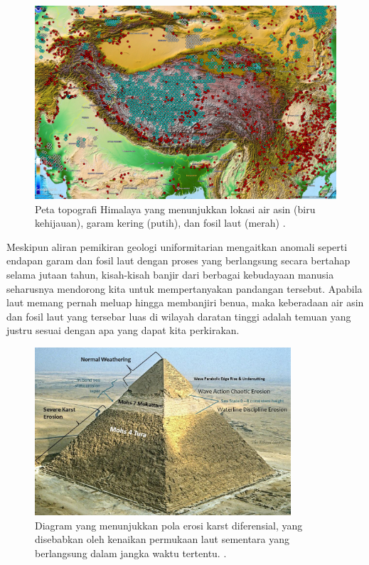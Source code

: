 \documentclass[10pt,twocolumn,letterpaper]{article}
\begin{document}
\begin{figure}[t]
\begin{center}
   \includegraphics[width=1\linewidth]{tibet.jpg}
\end{center}
   \caption{Peta topografi Himalaya yang menunjukkan lokasi air asin (biru kehijauan), garam kering (putih), dan fosil laut (merah) \cite{15,16,86,87}.}
\label{fig:3}
\label{fig:onecol}
\end{figure}

Meskipun aliran pemikiran geologi uniformitarian mengaitkan anomali seperti endapan garam dan fosil laut dengan proses yang berlangsung secara bertahap selama jutaan tahun, kisah-kisah banjir dari berbagai kebudayaan manusia seharusnya mendorong kita untuk mempertanyakan pandangan tersebut. Apabila laut memang pernah meluap hingga membanjiri benua, maka keberadaan air asin dan fosil laut yang tersebar luas di wilayah daratan tinggi adalah temuan yang justru sesuai dengan apa yang dapat kita perkirakan.

\begin{figure}[t]
\begin{center}
\includegraphics[width=0.85\textwidth]{khafre.jpg}
\end{center}
   \caption{Diagram yang menunjukkan pola erosi karst diferensial, yang disebabkan oleh kenaikan permukaan laut sementara yang berlangsung dalam jangka waktu tertentu. \cite{27}.}
\label{fig:4}
\end{figure}
\end{document}
